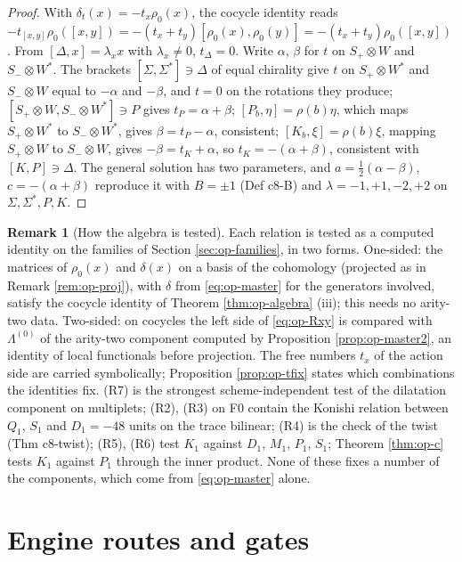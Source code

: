 \documentclass[11pt]{article}
\numberwithin{equation}{section}
\theoremstyle{plain}
\theoremstyle{definition}
\newtheorem{remark}[theorem]{Remark}
\begin{document}
\begin{proof}
With $\delta_t(x)=-t_x\rho_0(x)$, the cocycle identity reads $-t_{[x,y]}\rho_0([x,y])=-(t_x+t_y)[\rho_0(x),\rho_0(y)]=-(t_x+t_y)\rho_0([x,y])$. From $[\Delta,x]=\lambda_xx$ with $\lambda_x\ne0$, $t_\Delta=0$. Write $\alpha$, $\beta$ for $t$ on $S_+\otimes W$ and $S_-\otimes W^*$. The brackets $[\Sigma,\Sigma^*]\ni\Delta$ of equal chirality give $t$ on $S_+\otimes W^*$ and $S_-\otimes W$ equal to $-\alpha$ and $-\beta$, and $t=0$ on the rotations they produce; $[S_+\otimes W,S_-\otimes W^*]\ni P$ gives $t_P=\alpha+\beta$; $[P_b,\eta]=\rho(b)\eta$, which maps $S_+\otimes W^*$ to $S_-\otimes W^*$, gives $\beta=t_P-\alpha$, consistent; $[K_b,\xi]=\rho(b)\xi$, mapping $S_+\otimes W$ to $S_-\otimes W$, gives $-\beta=t_K+\alpha$, so $t_K=-(\alpha+\beta)$, consistent with $[K,P]\ni\Delta$. The general solution has two parameters, and $a=\tfrac12(\alpha-\beta)$, $c=-(\alpha+\beta)$ reproduce it with $B=\pm1$ (Def c8-B) and $\lambda=-1,+1,-2,+2$ on $\Sigma,\Sigma^*,P,K$.
\end{proof}

\begin{remark}[How the algebra is tested]
\label{rem:op-algtest}
Each relation is tested as a computed identity on the families of Section \ref{sec:op-families}, in two forms. One-sided: the matrices of $\rho_0(x)$ and $\delta(x)$ on a basis of the cohomology (projected as in Remark \ref{rem:op-proj}), with $\delta$ from \eqref{eq:op-master} for the generators involved, satisfy the cocycle identity of Theorem \ref{thm:op-algebra} (iii); this needs no arity-two data. Two-sided: on cocycles the left side of \eqref{eq:op-Rxy} is compared with $\Lambda^{(0)}$ of the arity-two component computed by Proposition \ref{prop:op-master2}, an identity of local functionals before projection. The free numbers $t_x$ of the action side are carried symbolically; Proposition \ref{prop:op-tfix} states which combinations the identities fix. (R7) is the strongest scheme-independent test of the dilatation component on multiplets; (R2), (R3) on F0 contain the Konishi relation between $Q_1$, $S_1$ and $D_1=-48$ units on the trace bilinear; (R4) is the check of the twist (Thm c8-twist); (R5), (R6) test $K_1$ against $D_1$, $M_1$, $P_1$, $S_1$; Theorem \ref{thm:op-c} tests $K_1$ against $P_1$ through the inner product. None of these fixes a number of the components, which come from \eqref{eq:op-master} alone.
\end{remark}

\section{Engine routes and gates}
\label{sec:op-engines}
\end{document}
